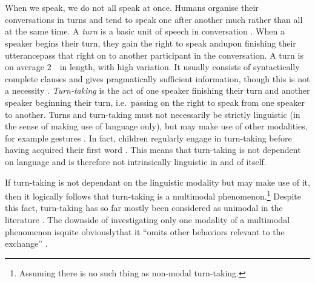 
\chapter{\introduction}
\label{ch:intro}
When we speak, we do not all speak at once.
Humans organise their conversations in turns and tend to speak one after another much rather than all at the same time.
A \emph{turn} is a basic unit of speech in conversation \citep{sacks_simplest_1978}.
When a speaker begins their turn, they gain the right to speak and\dash upon finishing their utterance\dash pass that right on to another participant in the conversation.
A turn is on average 2~\s\ in length, with high variation.
It usually consists of syntactically complete clauses and gives pragmatically sufficient information, though this is not a necessity \citep[]{levinson_turn-taking_2016}.
\emph{Turn-taking} is the act of one speaker finishing their turn and another speaker beginning their turn, i.e.\ passing on the right to speak from one speaker to another.
Turns and turn-taking must not necessarily be strictly linguistic (in the sense of making use of language only), but may make use of other modalities, for example gestures \citep[]{schmitt_zur_2005}.
In fact, children regularly engage in turn-taking before having acquired their first word \citep[]{casillas_turn-taking_2016}.
This means that turn-taking is not dependent on language and is therefore not intrinsically linguistic in and of itself.

If turn-taking is not dependant on the linguistic modality but may make use of it, then it logically follows that turn-taking is a multimodal phenomenon.\footnote{%
Assuming there is no such thing as non-modal turn-taking.}
Despite this fact, turn-taking has so far mostly been considered as unimodal in the literature \citep[]{rohlfing_multimodal_underreview}.
The downside of investigating only one modality of a multimodal phenomenon is\dash quite obviously\dash that it ``omits other behaviors relevant to the exchange'' \citep[]{rohlfing_multimodal_underreview}.

